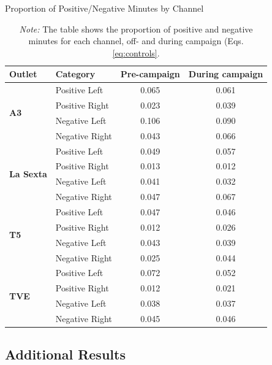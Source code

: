 \documentclass[12pt]{article}
\begin{document}
	
	
	
	\begin{table}[!htbp]
		\centering
		\caption{Proportion of Positive/Negative Minutes by Channel}
		\begin{tabular}{llcc}
			\toprule
			\textbf{Outlet} & \textbf{Category} & \textbf{Pre-campaign} & \textbf{During campaign} \\
			\midrule
			\midrule
			\multirow{4}{*}{\textbf{A3}} & Positive Left & 0.065 & 0.061 \\
			& Positive Right & 0.023 & 0.039 \\
			& Negative Left & 0.106 & 0.090 \\
			& Negative Right & 0.043 & 0.066 \\
			\midrule
			\multirow{4}{*}{\textbf{La Sexta}} & Positive Left & 0.049 & 0.057 \\
			& Positive Right & 0.013 & 0.012 \\
			& Negative Left & 0.041 & 0.032 \\
			& Negative Right & 0.047 & 0.067 \\
			\midrule
			\multirow{4}{*}{\textbf{T5}} & Positive Left & 0.047 & 0.046 \\
			& Positive Right & 0.012 & 0.026 \\
			& Negative Left & 0.043 & 0.039 \\
			& Negative Right & 0.025 & 0.044 \\
			\midrule
			\multirow{4}{*}{\textbf{TVE}} & Positive Left & 0.072 & 0.052 \\
			& Positive Right & 0.012 & 0.021 \\
			& Negative Left & 0.038 & 0.037 \\
			& Negative Right & 0.045 & 0.046 \\
			\midrule
			\bottomrule
		\end{tabular}
		\caption*{\small \textit{Note:} The table shows the proportion of positive and negative minutes for each channel, off- and during campaign  (Eqs. \eqref{eq:controls}.}
		\label{tab:positive_negative_minutes}
	\end{table}
	
	
	\FloatBarrier
	
	
	\subsection{Additional Results}
	
	

	
\end{document}
